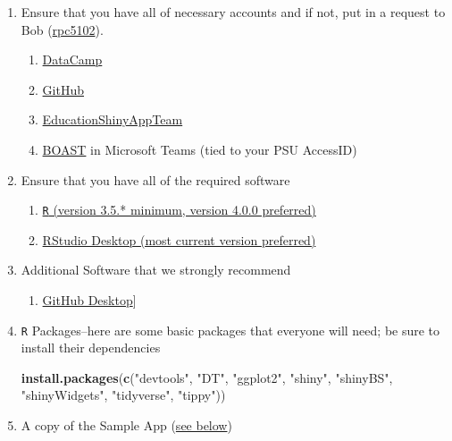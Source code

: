 \documentclass[
]{book}
\newenvironment{Shaded}{\begin{snugshade}}{\end{snugshade}}
\newcommand{\KeywordTok}[1]{\textcolor[rgb]{0.13,0.29,0.53}{\textbf{#1}}}
\newcommand{\NormalTok}[1]{#1}
\newcommand{\StringTok}[1]{\textcolor[rgb]{0.31,0.60,0.02}{#1}}
\providecommand{\tightlist}{%
  \setlength{\itemsep}{0pt}\setlength{\parskip}{0pt}}
\begin{document}
\begin{enumerate}
\def\labelenumi{\arabic{enumi}.}
\item
  Ensure that you have all of necessary accounts and if not, put in a request to Bob (\href{mailto:rpc5102@psu.edu}{rpc5102}).

  \begin{enumerate}
  \def\labelenumii{\alph{enumii}.}
  \tightlist
  \item
    \href{https://www.datacamp.com/}{DataCamp}\\
  \item
    \href{https://github.com/}{GitHub}\\
  \item
    \href{https://github.com/EducationShinyAppTeam}{EducationShinyAppTeam}
  \item
    \href{https://teams.microsoft.com/l/team/19\%3a8423bc25992a4451952d8312b497324d\%40thread.skype/conversations?groupId=a83c9d1b-6bcc-46f4-aa25-82b2fad862ec\&tenantId=7cf48d45-3ddb-4389-a9c1-c115526eb52e}{BOAST} in Microsoft Teams (tied to your PSU AccessID)
  \end{enumerate}
\item
  Ensure that you have all of the required software

  \begin{enumerate}
  \def\labelenumii{\alph{enumii}.}
  \tightlist
  \item
    \href{https://cloud.r-project.org/}{\texttt{R} (version 3.5.* minimum, version 4.0.0 preferred)}
  \item
    \href{https://rstudio.com/products/rstudio/download/\#download}{RStudio Desktop (most current version preferred)}
  \end{enumerate}
\item
  Additional Software that we strongly recommend

  \begin{enumerate}
  \def\labelenumii{\alph{enumii}.}
  \tightlist
  \item
    \href{https://desktop.github.com/}{GitHub Desktop}{]}
  \end{enumerate}
\item
  \texttt{R} Packages--here are some basic packages that everyone will need; be sure to install their dependencies

\begin{Shaded}
\begin{Highlighting}[]
\KeywordTok{install.packages}\NormalTok{(}\KeywordTok{c}\NormalTok{(}\StringTok{"devtools"}\NormalTok{, }\StringTok{"DT"}\NormalTok{, }\StringTok{"ggplot2"}\NormalTok{, }\StringTok{"shiny"}\NormalTok{, }\StringTok{"shinyBS"}\NormalTok{, }
                   \StringTok{"shinyWidgets"}\NormalTok{, }\StringTok{"tidyverse"}\NormalTok{, }\StringTok{"tippy"}\NormalTok{))}
\end{Highlighting}
\end{Shaded}
\item
  A copy of the Sample App (\protect\hyperlink{sample-app}{see below})
\end{enumerate}
\end{document}
